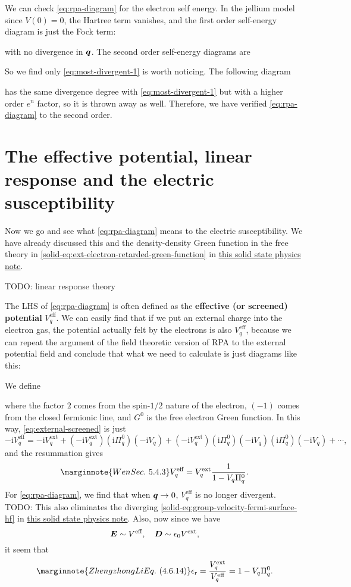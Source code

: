 \documentclass[hyperref, a4paper]{article}
\newcommand*{\ii}{\mathrm{i}}
\newcommand*{\concept}[1]{{\textbf{#1}}}
\newcommand{\soliddoc}{\href{../solid/solid.pdf}{this solid state physics note}}
\begin{document}
We can check \eqref{eq:rpa-diagram} for the electron self energy. In the jellium model since $V(0) = 0$, 
the Hartree term vanishes, and the first order self-energy diagram is just the Fock term: 

with no divergence in $\vb*{q}$. The second order self-energy diagrams are 



So we find only \eqref{eq:most-divergent-1} is worth noticing. The following diagram 

has the same divergence degree with \eqref{eq:most-divergent-1} but with a higher order $e^n$ factor,
so it is thrown away as well. Therefore, we have verified \eqref{eq:rpa-diagram} to the second order.

\section{The effective potential, linear response and the electric susceptibility}\label{sec:response}

Now we go and see what \eqref{eq:rpa-diagram} means to the electric susceptibility. We have already discussed this and the density-density Green function in the free theory in \eqref{solid-eq:ext-electron-retarded-green-function} in \soliddoc. %

TODO: linear response theory

The LHS of \eqref{eq:rpa-diagram} is often defined as the \concept{effective (or screened) potential} $V^\text{eff}_{q}$.
We can easily find that if we put an external charge into the electron gas, the potential actually felt 
by the electrons is also $V^\text{eff}_q$, because we can repeat the argument of the field theoretic version 
of RPA to the external potential field and conclude that what we need to calculate is just diagrams like this:

We define 

where the factor $2$ comes from the spin-$1/2$ nature of the electron, $(-1)$ comes from the closed fermionic line,
and $G^0$ is the free electron Green function. In this way, \eqref{eq:external-screened} is just 
\[
    - \ii V^\text{eff}_q = - \ii V^\text{ext}_q + (- \ii V^\text{ext}_q) (\ii \Pi^0_q) (- \ii V_q) + 
    (- \ii V^\text{ext}_q) (\ii \Pi^0_q) (- \ii V_q) (\ii \Pi^0_q) (- \ii V_q) + \cdots,
\]
and the resummation gives 
\begin{equation} \marginnote{Wen Sec.~5.4.3}
    V^\text{eff}_q = V^\text{ext}_q \frac{1}{1 - V_q \Pi^0_q}.
    \label{eq:v-eff-resum}
\end{equation}
For \eqref{eq:rpa-diagram}, we find that when $\vb*{q} \to 0$, $V^\text{eff}_q$ is no longer divergent. 
TODO: This also eliminates the diverging \eqref{solid-eq:group-velocity-fermi-surface-hf} in \soliddoc.
Also, now since we have 
\[
    \vb*{E} \sim V^\text{eff}, \quad \vb*{D} \sim \epsilon_0 V^\text{ext},
\]
it seem that  
\begin{equation} \marginnote{Zhengzhong Li Eq.~(4.6.14)}
    \epsilon_\text{r} = \frac{V^\text{ext}_{q}}{V^\text{eff}_q} = 1 - V_q \Pi^0_q.
    \label{eq:epsilon-r}
\end{equation}
\end{document}
